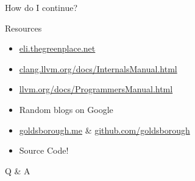 
\begin{slide}{}
  \fontsize{32}{32}\selectfont
  \color{llvmblue}
  How do I continue?
\end{slide}

\begin{slide}{Resources}
  \begin{itemize}
      \item \url{eli.thegreenplace.net}
      \item \url{clang.llvm.org/docs/InternalsManual.html}
      \item \url{llvm.org/docs/ProgrammersManual.html}
      \item Random blogs on Google
      \item \url{goldsborough.me} \& \url{github.com/goldsborough}
      \item Source Code!
  \end{itemize}
\end{slide}

%

\begin{slide}{}
  \vspace{0.5cm}
  \fontsize{48}{48}\selectfont
  \color{llvmblue}
  Q \& A
\end{slide}
